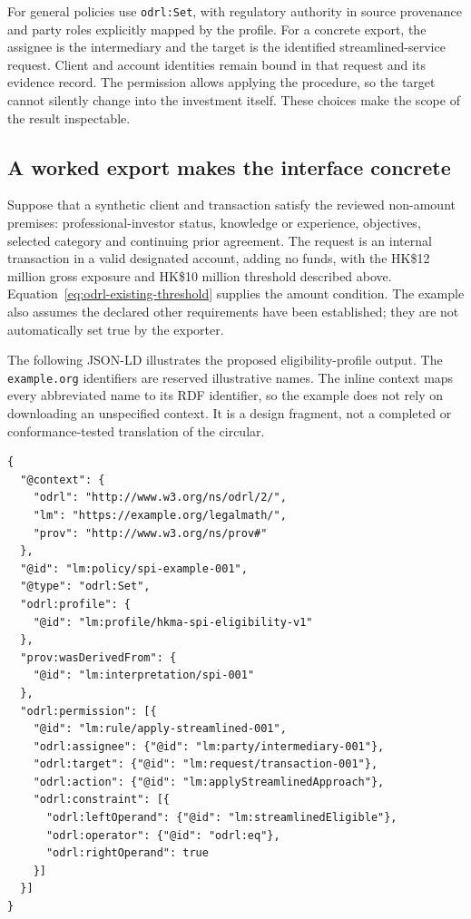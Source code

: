 For general policies use \texttt{odrl:Set}, with regulatory authority in
source provenance and party roles explicitly mapped by the profile. For a
concrete export, the assignee is the intermediary and the target is the
identified streamlined-service request. Client and account identities remain
bound in that request and its evidence record. The permission allows applying
the procedure, so the target cannot silently change into the investment itself.
These choices make the scope of the result inspectable.

\subsection{A worked export makes the interface concrete}

Suppose that a synthetic client and transaction satisfy the reviewed
non-amount premises: professional-investor status, knowledge or experience,
objectives, selected category and continuing prior agreement. The request
is an internal transaction in a valid designated account, adding no funds,
with the HK\$12 million gross exposure and HK\$10 million threshold described
above. Equation~\ref{eq:odrl-existing-threshold} supplies the amount condition.
The example also assumes the declared other requirements have been established;
they are not automatically set true by the exporter.

The following JSON-LD illustrates the proposed eligibility-profile output.
The \texttt{example.org} identifiers are reserved illustrative names. The
inline context maps every abbreviated name to its RDF identifier, so the
example does not rely on downloading an unspecified context. It is a design
fragment, not a completed or conformance-tested translation of the circular.

\begin{lstlisting}[float=htbp,caption={An illustrative permission to apply a procedure to one request.},label={lst:odrl-permission-fragment}]
{
  "@context": {
    "odrl": "http://www.w3.org/ns/odrl/2/",
    "lm": "https://example.org/legalmath/",
    "prov": "http://www.w3.org/ns/prov#"
  },
  "@id": "lm:policy/spi-example-001",
  "@type": "odrl:Set",
  "odrl:profile": {
    "@id": "lm:profile/hkma-spi-eligibility-v1"
  },
  "prov:wasDerivedFrom": {
    "@id": "lm:interpretation/spi-001"
  },
  "odrl:permission": [{
    "@id": "lm:rule/apply-streamlined-001",
    "odrl:assignee": {"@id": "lm:party/intermediary-001"},
    "odrl:target": {"@id": "lm:request/transaction-001"},
    "odrl:action": {"@id": "lm:applyStreamlinedApproach"},
    "odrl:constraint": [{
      "odrl:leftOperand": {"@id": "lm:streamlinedEligible"},
      "odrl:operator": {"@id": "odrl:eq"},
      "odrl:rightOperand": true
    }]
  }]
}
\end{lstlisting}

